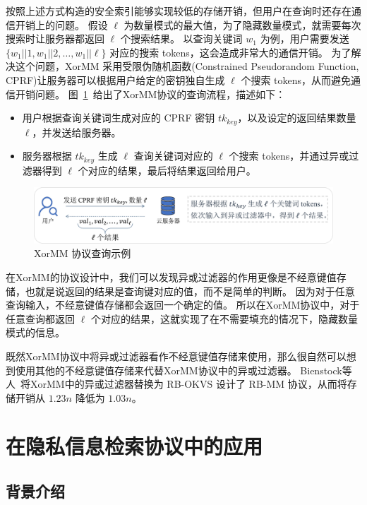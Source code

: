 按照上述方式构造的安全索引能够实现较低的存储开销，但用户在查询时还存在通信开销上的问题。
假设 $\ell$ 为数量模式的最大值，为了隐藏数量模式，就需要每次搜索时让服务器都返回 $\ell$ 个搜索结果。
以查询关键词 $w_1$ 为例，用户需要发送 $\{w_1 || 1, w_1 ||2, \dots, w_1 || \ell \}$ 对应的搜索 tokens，这会造成非常大的通信开销。
为了解决这个问题，XorMM 采用受限伪随机函数(Constrained Pseudorandom Function, CPRF)让服务器可以根据用户给定的密钥独自生成 $\ell$ 个搜索 tokens，从而避免通信开销问题。
图~\ref{fig:xormm_example}~给出了XorMM协议的查询流程，描述如下：
\begin{itemize}
  \item 用户根据查询关键词生成对应的 CPRF 密钥 $tk_{key}$，以及设定的返回结果数量 $\ell$，并发送给服务器。
  \item 服务器根据 $tk_{key}$ 生成 $\ell$ 查询关键词对应的 $\ell$ 个搜索 tokens，并通过异或过滤器得到 $\ell$ 个对应的结果，最后将结果返回给用户。
\end{itemize}
\begin{figure}[ht]
  \centering
  \includegraphics[width=\textwidth]{figures/xormm_exp.pdf}
  \caption{XorMM 协议查询示例}
  \label{fig:xormm_example}
\end{figure}

在XorMM的协议设计中，我们可以发现异或过滤器的作用更像是不经意键值存储，也就是说返回的结果是查询键对应的值，而不是简单的判断。
因为对于任意查询输入，不经意键值存储都会返回一个确定的值。
所以在XorMM协议中，对于任意查询都返回 $\ell$ 个对应的结果，这就实现了在不需要填充的情况下，隐藏数量模式的信息。

既然XorMM协议中将异或过滤器看作不经意键值存储来使用，那么很自然可以想到使用其他的不经意键值存储来代替XorMM协议中的异或过滤器。
Bienstock等人~\cite{bienstock2023NearOptimal}将XorMM中的异或过滤器替换为 RB-OKVS 设计了 RB-MM 协议，从而将存储开销从 $1.23n$ 降低为 $1.03n$。

\section{在隐私信息检索协议中的应用}

\subsection{背景介绍}

